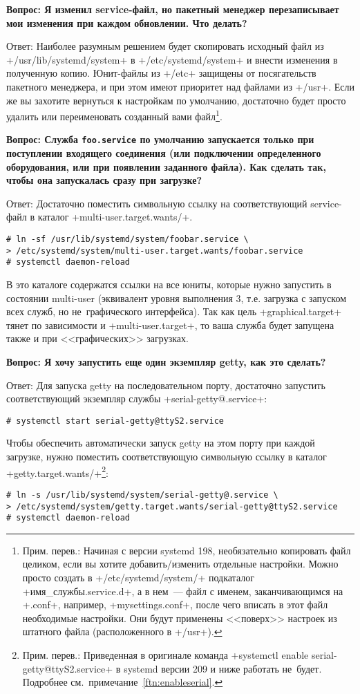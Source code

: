 \documentclass[10pt,oneside,a4paper]{article}
\newcommand{\qna}[1]{\medskip\par\textbf{Вопрос: #1}\nopagebreak\par Ответ:}
\begin{document}
\qna{Я изменил service-файл, но пакетный менеджер перезаписывает мои изменения
при каждом обновлении. Что делать?}
Наиболее разумным решением будет скопировать исходный файл из
+/usr/lib/systemd/system+ в +/etc/systemd/system+ и внести изменения в
полученную копию. Юнит-файлы из +/etc+ защищены от посягательств пакетного
менеджера, и при этом имеют приоритет над файлами из +/usr+. Если же вы захотите
вернуться к настройкам по умолчанию, достаточно будет просто удалить или
переименовать созданный вами файл\footnote{Прим. перев.: Начиная с версии
systemd 198, необязательно копировать файл целиком, если вы хотите
добавить/изменить отдельные настройки. Можно просто создать в
+/etc/systemd/system/+ подкаталог +имя_службы.service.d+, а в нем~--- файл с
именем, заканчивающимся на +.conf+, например, +mysettings.conf+, после чего
вписать в этот файл необходимые настройки. Они будут применены <<поверх>>
настроек из штатного файла (расположенного в +/usr+).}.

\qna{Служба \texttt{foo.service} по умолчанию запускается только при поступлении
входящего соединения (или подключении определенного оборудования, или при
появлении заданного файла). Как сделать так, чтобы она запускалась сразу при
загрузке?}
Достаточно поместить символьную ссылку на соответствующий service-файл в каталог
+multi-user.target.wants/+.
\begin{Verbatim}
# ln -sf /usr/lib/systemd/system/foobar.service \ 
> /etc/systemd/system/multi-user.target.wants/foobar.service
# systemctl daemon-reload
\end{Verbatim}

В это каталоге содержатся ссылки на все юниты, которые нужно запустить в
состоянии multi-user (эквивалент уровня выполнения 3, т.е. загрузка с запуском
всех служб, но не~графического интерфейса). Так как цель +graphical.target+
тянет по зависимости и +multi-user.target+, то ваша служба будет запущена также
и при <<графических>> загрузках.

\qna{Я хочу запустить еще один экземпляр getty, как это сделать?}
Для запуска getty на последовательном порту, достаточно запустить
соответствующий экземпляр службы +serial-getty@.service+:
\begin{Verbatim}
# systemctl start serial-getty@ttyS2.service
\end{Verbatim}

Чтобы обеспечить автоматически запуск getty на этом порту при каждой загрузке,
нужно поместить соответствующую символьную ссылку в каталог
+getty.target.wants/+\footnote{Прим. перев.: Приведенная в оригинале команда
+systemctl enable serial-getty@ttyS2.service+ в systemd версии 209 и ниже 
работать не~будет. Подробнее см.~примечание~\ref{ftn:enableserial}.}:
\begin{Verbatim}
# ln -s /usr/lib/systemd/system/serial-getty@.service \
> /etc/systemd/system/getty.target.wants/serial-getty@ttyS2.service
# systemctl daemon-reload
\end{Verbatim}
\end{document}
